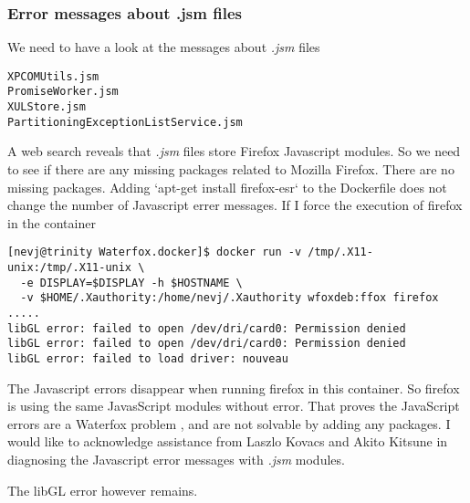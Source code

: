 \documentclass[a4paper]{article}  %
\begin{document}
\subsubsection{Error messages about .jsm files}
We need to have a look at the messages about {\em .jsm} files
\begin{tcolorbox}
\begin{verbatim}
XPCOMUtils.jsm
PromiseWorker.jsm
XULStore.jsm
PartitioningExceptionListService.jsm
\end{verbatim}
\end{tcolorbox}
A web search reveals that {\em .jsm} files store Firefox Javascript modules. So we need to see if there are any missing packages related to Mozilla Firefox.
There are no missing packages. 
Adding `apt-get install firefox-esr` to the Dockerfile does not change the number of Javascript errer messages.  If I force the execution of firefox in the container
\begin{tcolorbox}
\begin{verbatim}
[nevj@trinity Waterfox.docker]$ docker run -v /tmp/.X11-unix:/tmp/.X11-unix \
  -e DISPLAY=$DISPLAY -h $HOSTNAME \
  -v $HOME/.Xauthority:/home/nevj/.Xauthority wfoxdeb:ffox firefox
.....
libGL error: failed to open /dev/dri/card0: Permission denied
libGL error: failed to open /dev/dri/card0: Permission denied
libGL error: failed to load driver: nouveau
\end{verbatim}
\end{tcolorbox}

The Javascript errors disappear when running firefox in this container. So firefox is using  the same JavasScript modules without error. That proves the JavaScript errors are a Waterfox problem , and are not solvable by adding any packages.
I would like to acknowledge assistance from Laszlo Kovacs and Akito Kitsune in diagnosing the Javascript error messages with {\em .jsm} modules.

The libGL error however remains.
\end{document}
